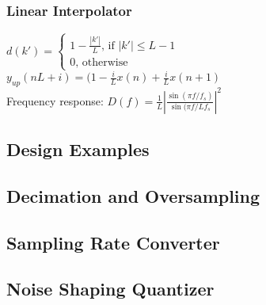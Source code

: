 \subsubsection{Linear Interpolator}
$d(k')=\begin{cases}
1-\frac{|k'|}{L}\text{, if }|k'|\leq L -1\\
0\text{, otherwise}\end{cases}$\\
$y_{up}(nL+i)=(1-\frac{i}{L}x(n)+\frac{i}{L}x(n+1)$\\
Frequency response: $D(f)=\frac{1}{L}\left|\frac{\sin(\pi f/f_s)}{\sin(\pi f/Lf_s}\right|^2$
\subsection{Design Examples}
\subsection{Decimation and Oversampling}
\subsection{Sampling Rate Converter}
\subsection{Noise Shaping Quantizer}
